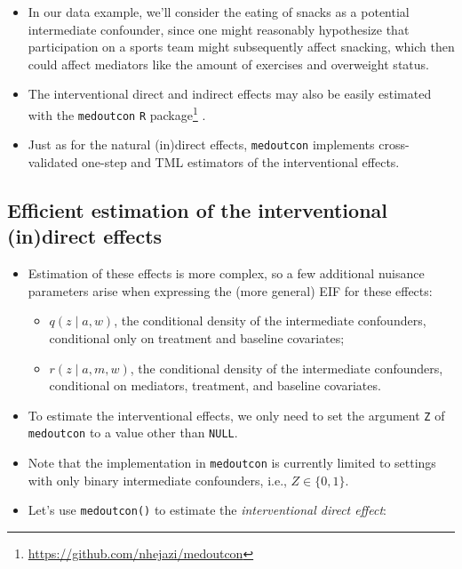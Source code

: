 \documentclass[
  12pt,
]{book}
\newcommand{\passthrough}[1]{#1}
\providecommand{\tightlist}{%
  \setlength{\itemsep}{0pt}\setlength{\parskip}{0pt}}
\renewcommand{\href}[2]{#2\footnote{\url{#1}}}
\theoremstyle{definition}
\theoremstyle{definition}
\theoremstyle{definition}
\newcommand{\1}{\mathbbm{1}}
\begin{document}
\begin{itemize}
\tightlist
\item
  In our data example, we'll consider the eating of snacks as a potential
  intermediate confounder, since one might reasonably hypothesize that
  participation on a sports team might subsequently affect snacking, which then
  could affect mediators like the amount of exercises and overweight status.
\item
  The interventional direct and indirect effects may also be easily estimated
  with the \href{https://github.com/nhejazi/medoutcon}{\passthrough{\lstinline!medoutcon!} \passthrough{\lstinline!R!} package}
  \citep{hejazi2022medoutcon-rpkg, hejazi2022medoutcon-joss}.
\item
  Just as for the natural (in)direct effects, \passthrough{\lstinline!medoutcon!} implements
  cross-validated one-step and TML estimators of the interventional effects.
\end{itemize}

\hypertarget{efficient-estimation-of-the-interventional-indirect-effects}{%
\subsection{Efficient estimation of the interventional (in)direct effects}\label{efficient-estimation-of-the-interventional-indirect-effects}}

\begin{itemize}
\tightlist
\item
  Estimation of these effects is more complex, so a few additional nuisance
  parameters arise when expressing the (more general) EIF for these effects:

  \begin{itemize}
  \tightlist
  \item
    \(q(z \mid a, w)\), the conditional density of the intermediate confounders,
    conditional only on treatment and baseline covariates;
  \item
    \(r(z \mid a, m, w)\), the conditional density of the intermediate
    confounders, conditional on mediators, treatment, and baseline covariates.
  \end{itemize}
\item
  To estimate the interventional effects, we only need to set the argument \passthrough{\lstinline!Z!}
  of \passthrough{\lstinline!medoutcon!} to a value other than \passthrough{\lstinline!NULL!}.
\item
  Note that the implementation in \passthrough{\lstinline!medoutcon!} is currently limited to settings
  with only binary intermediate confounders, i.e., \(Z \in \{0, 1\}\).
\item
  Let's use \passthrough{\lstinline!medoutcon()!} to estimate the \emph{interventional direct effect}:
\end{itemize}
\end{document}
